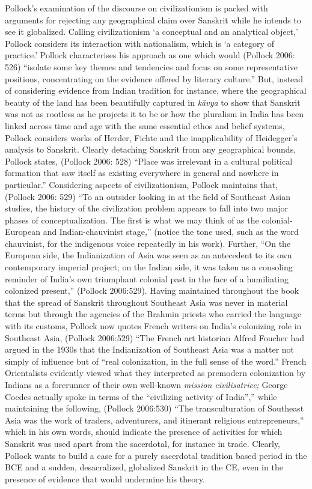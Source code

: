 Pollock’s examination of the discourse on civilizationism is packed with arguments for rejecting any geographical claim over Sanskrit while he intends to see it globalized. Calling civilizationism ‘a conceptual and an analytical object,’ Pollock considers its interaction with nationalism, which is ‘a category of practice.’ Pollock characterises his approach as one which would (Pollock 2006: 526) “isolate some key themes and tendencies and focus on some representative positions, concentrating on the evidence offered by literary culture.” But, instead of considering evidence from Indian tradition for instance, where the geographical beauty of the land has been beautifully captured in \textit{kāvya} to show that Sanskrit was not as rootless as he projects it to be or how the pluralism in India has been linked across time and age with the same essential ethos and belief systems, Pollock considers works of Herder, Fichte and the inapplicability of Heidegger’s analysis to Sanskrit. Clearly detaching Sanskrit from any geographical bounds, Pollock states, (Pollock 2006: 528) “Place was irrelevant in a cultural political formation that saw itself as existing everywhere in general and nowhere in particular.” Considering aspects of civilizationism, Pollock maintains that, (Pollock 2006: 529) “To an outsider looking in at the field of Southeast Asian studies, the history of the civilization problem appears to fall into two major phases of conceptualization. The first is what we may think of as the colonial-European and Indian-chauvinist stage,” (notice the tone used, such as the word chauvinist, for the indigenous voice repeatedly in his work). Further, “On the European side, the Indianization of Asia was seen as an antecedent to its own contemporary imperial project; on the Indian side, it was taken as a consoling reminder of India’s own triumphant colonial past in the face of a humiliating colonized present,” (Pollock 2006:529). Having maintained throughout the book that the spread of Sanskrit throughout Southeast Asia was never in material terms but through the agencies of the Brahmin priests who carried the language with its customs, Pollock now quotes French writers on India’s colonizing role in Southeast Asia, (Pollock 2006:529) “The French art historian Alfred Foucher had argued in the 1930s that the Indianization of Southeast Asia was a matter not simply of influence but of “real colonization, in the full sense of the word.” French Orientalists evidently viewed what they interpreted as premodern colonization by Indians as a forerunner of their own well-known \textit{mission civilisatrice;} George Coedes actually spoke in terms of the “civilizing activity of India”,” while maintaining the following, (Pollock 2006:530) “The transculturation of Southeast Asia was the work of traders, adventurers, and itinerant religious entrepreneurs,” which in his own words, should indicate the presence of activities for which Sanskrit was used apart from the sacerdotal, for instance in trade. Clearly, Pollock wants to build a case for a purely sacerdotal tradition based period in the BCE and a sudden, desacralized, globalized Sanskrit in the CE, even in the presence of evidence that would undermine his theory.

